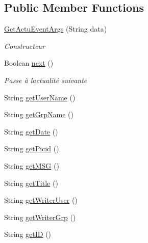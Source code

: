 \subsection*{Public Member Functions}
\begin{DoxyCompactItemize}
\item 
\mbox{\hyperlink{class_n_t_k_1_1_events_args_1_1_get_actu_event_args_af0122a3a973c3897b1eba4f0c10ddf11}{Get\+Actu\+Event\+Args}} (String data)
\begin{DoxyCompactList}\small\item\em Constructeur \end{DoxyCompactList}\item 
Boolean \mbox{\hyperlink{class_n_t_k_1_1_events_args_1_1_get_actu_event_args_adaa88e12981361422af1ca48219ffeab}{next}} ()
\begin{DoxyCompactList}\small\item\em Passe à l\textquotesingle{}actualité suivante \end{DoxyCompactList}\item 
String \mbox{\hyperlink{class_n_t_k_1_1_events_args_1_1_get_actu_event_args_ae21cebd0f5470a64031ce126bc992d77}{get\+User\+Name}} ()
\item 
String \mbox{\hyperlink{class_n_t_k_1_1_events_args_1_1_get_actu_event_args_af2dbce9115426108956b6f1b04563799}{get\+Grp\+Name}} ()
\item 
String \mbox{\hyperlink{class_n_t_k_1_1_events_args_1_1_get_actu_event_args_a699190b100dbf162698e9bb82ce94e3b}{get\+Date}} ()
\item 
String \mbox{\hyperlink{class_n_t_k_1_1_events_args_1_1_get_actu_event_args_ab37b8c927d23c37a36f4a8397dd23d70}{get\+Picid}} ()
\item 
String \mbox{\hyperlink{class_n_t_k_1_1_events_args_1_1_get_actu_event_args_af8ad0b4644a6483a9ea4bbffcfde2859}{get\+M\+SG}} ()
\item 
String \mbox{\hyperlink{class_n_t_k_1_1_events_args_1_1_get_actu_event_args_adefeaa435e837006f385776d556860a9}{get\+Title}} ()
\item 
String \mbox{\hyperlink{class_n_t_k_1_1_events_args_1_1_get_actu_event_args_a3778fa35dcfc353aea209c25bfcfa138}{get\+Writer\+User}} ()
\item 
String \mbox{\hyperlink{class_n_t_k_1_1_events_args_1_1_get_actu_event_args_af65a16912322b048e730f55effc620fe}{get\+Writer\+Grp}} ()
\item 
String \mbox{\hyperlink{class_n_t_k_1_1_events_args_1_1_get_actu_event_args_a4a11136a4dda587c2df2fa439dfa2ecb}{get\+ID}} ()
\end{DoxyCompactItemize}


